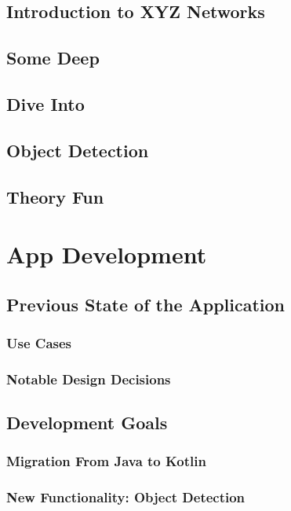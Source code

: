 \documentclass[
			   fontsize=11pt,
               paper=a4,
               bibliography=totoc,
               idxtotoc,
               headsepline,
               footsepline,
               footinclude=false,
               BCOR=12mm,
               DIV=13,
               openany,   %
               ]
               {scrbook}
\begin{document}
\section{Introduction to XYZ Networks}


\section{Some Deep}
\section{Dive Into}
\section{Object Detection}
\section{Theory Fun}

\chapter{App Development}

\section{Previous State of the Application}

\subsection{Use Cases}

\subsection{Notable Design Decisions}

\section{Development Goals}

\subsection{Migration From Java to Kotlin}

\subsection{New Functionality: Object Detection}
\end{document}
